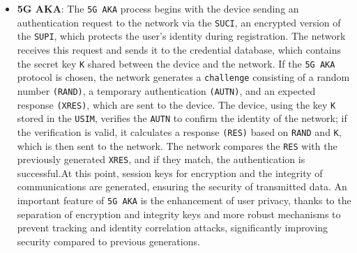 \documentclass[english]{article}
\begin{document}
\begin{itemize}
	\item \textbf{\hypertarget{5G AKA}{5G AKA}}:
	      The \texttt{5G AKA} process begins with the device sending an authentication
	      request to the network via the \texttt{SUCI}, an encrypted version of the
	      \texttt{SUPI}, which protects the user's identity during registration.
	      The network receives this request and sends it to the credential database,
	      which contains the secret key \texttt{K} shared between the device and the network.
	      If the \texttt{5G AKA} protocol is chosen, the network generates a \texttt{challenge}
	      consisting of a random number \texttt{(RAND)}, a temporary authentication \texttt{(AUTN)},
	      and an expected response \texttt{(XRES)}, which are sent to the device. The device,
	      using the key \texttt{K} stored in the \texttt{USIM}, verifies the \texttt{AUTN} to
	      confirm the identity of the network; if the verification is valid, it calculates a
	      response \texttt{(RES)} based on \texttt{RAND} and \texttt{K}, which is then sent to
	      the network. The network compares the \texttt{RES} with the previously generated
	      \texttt{XRES}, and if they match, the authentication is successful.\@ At this point,
	      session keys for encryption and the integrity of communications are generated, ensuring
	      the security of transmitted data. An important feature of \texttt{5G AKA} is the
	      enhancement of user privacy, thanks to the separation of encryption and integrity
	      keys and more robust mechanisms to prevent tracking and identity correlation attacks,
	      significantly improving security compared to previous generations.\@

\end{itemize}
\end{document}
